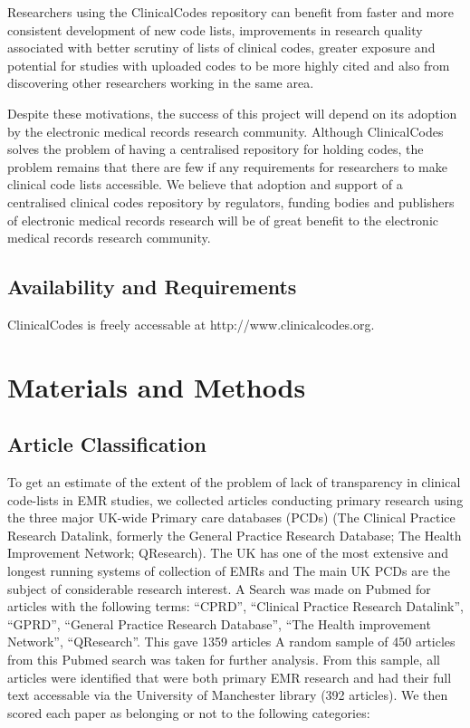 \documentclass[10pt]{article}
\begin{document}
Researchers using the ClinicalCodes repository can benefit from faster and more consistent development of new code lists, improvements in research quality associated with better scrutiny of lists of clinical codes, greater exposure and potential for studies with uploaded codes to be more highly cited and also from discovering other researchers working in the same area.

Despite these motivations, the success of this project will depend on its adoption by the electronic medical records research community. Although ClinicalCodes solves the problem of having a centralised repository for holding codes, the problem remains that there are few if any requirements for researchers to make clinical code lists accessible. We believe that adoption and support of a centralised clinical codes repository by regulators, funding bodies and publishers of electronic medical records research will be of great benefit to the electronic medical records research community.

\subsection*{Availability and Requirements}


ClinicalCodes is freely accessable at http://www.clinicalcodes.org.

\section*{Materials and Methods}

\subsection*{Article Classification}

To get an estimate of the extent of the problem of lack of transparency in clinical code-lists in EMR studies, we collected articles conducting primary research using the three major UK-wide Primary care databases (PCDs) (The Clinical Practice Research Datalink, formerly the General Practice Research Database; The Health Improvement Network; QResearch).  The UK has one of the most extensive and longest running systems of collection of EMRs and The main UK PCDs are the subject of considerable research interest.  A Search was made on Pubmed for articles with the following terms: ``CPRD'', ``Clinical Practice Research Datalink'', ``GPRD'', ``General Practice Research Database'', ``The Health improvement Network'', ``QResearch''. This gave 1359 articles  A random sample of 450 articles from this Pubmed search was taken for further analysis.  From this sample, all articles were identified that were both primary EMR research and had their full text accessable via the University of Manchester library (392 articles). We then scored each paper as belonging or not to the following categories:
\end{document}
